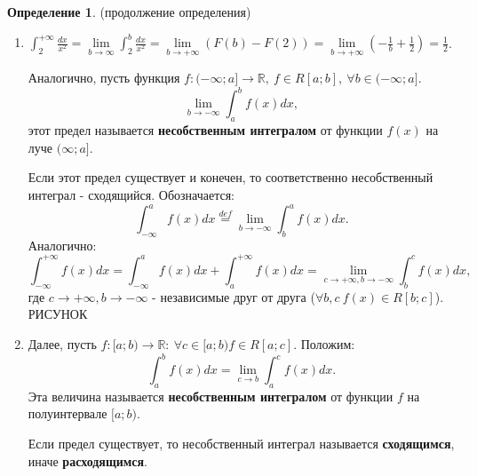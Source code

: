 \documentclass{report}
\theoremstyle{definition}
\newtheorem*{definition}{Определение}
\begin{document}
\begin{definition}
    (продолжение определения)

    \begin{enumerate}
        \item $\int_{2}^{+\infty}\frac{dx}{x^2} = \underset{b\rightarrow\infty}{\lim}\int_{2}^{b}\frac{dx}{x^2} =
                  \underset{b\rightarrow+\infty}{\lim}(F(b) - F(2)) = \underset{b\rightarrow+\infty}{\lim}(-\frac{1}{b} +
                  \frac{1}{2}) = \frac{1}{2}$.

              Аналогично, пусть функция $f:(-\infty;a]\rightarrow\mathbb{R}, \ f\in R[a;b], \ \forall b \in (-\infty;a]$.
              \begin{equation*}
                  \underset{b\rightarrow-\infty}{\lim}\int_{a}^{b}f(x)dx,
              \end{equation*}
              этот предел называется \textbf{несобственным интегралом} от функции $f(x)$ на луче $(\infty;a]$.

              Если этот предел существует и конечен, то соответственно несобственный интеграл - сходящийся. Обозначается:
              \begin{equation*}
                  \int_{-\infty}^{a}f(x)dx \overset{def}{=}\underset{b\rightarrow-\infty}{\lim}\int_{b}^{a}f(x)dx.
              \end{equation*}
              Аналогично:
              \begin{equation*}
                  \int_{-\infty}^{+\infty}f(x)dx = \int_{-\infty}^{a}f(x)dx + \int_{a}^{+\infty}f(x)dx = \underset{c
                      \rightarrow+\infty, b\rightarrow-\infty}{\lim}\int_{b}^{c}f(x)dx,
              \end{equation*}
              где $c\rightarrow+\infty, b\rightarrow-\infty$ - независимые друг от друга ($\forall b,c \ f(x)\in
                  R[b;c]$). {\Large РИСУНОК}

        \item Далее, пусть $f:[a;b)\rightarrow\mathbb{R}: \ \forall c \in [a;b) f\in R[a;c]$. Положим:
                          \begin{equation*}
                              \int_{a}^{b}f(x)dx = \underset{c\rightarrow b}{\lim}\int_{a}^{c}f(x)dx.
                          \end{equation*}
                          Эта величина называется \textbf{несобственным интегралом} от функции $f$ на полуинтервале $[a;b)$.

                                  Если предел существует, то несобственный интеграл называется \textbf{сходящимся}, иначе \textbf{расходящимся}.


\end{enumerate}
\end{definition}
\end{document}
